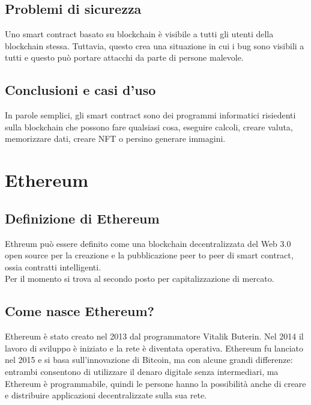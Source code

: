 \documentclass[a4paper,11pt]{report}
\begin{document}
\section{Problemi di sicurezza}
Uno smart contract basato su blockchain è visibile a tutti gli utenti della blockchain stessa. Tuttavia, questo crea una situazione in cui i bug sono visibili a tutti e questo può portare attacchi da parte di persone malevole.

\section{Conclusioni e casi d'uso}
In parole semplici, gli smart contract sono dei programmi informatici risiedenti sulla blockchain che possono fare qualsiasi cosa, eseguire calcoli, creare valuta, memorizzare dati, creare NFT o persino generare immagini.

\chapter{Ethereum}
\section{Definizione di Ethereum}
Ethreum può essere definito come una blockchain decentralizzata del Web 3.0 open source per la creazione e la pubblicazione peer to peer di smart contract, ossia contratti intelligenti.\\
Per il momento si trova al secondo posto per capitalizzazione di mercato.

\section{Come nasce Ethereum?}
Ethereum è stato creato nel 2013 dal programmatore Vitalik Buterin. Nel 2014 il lavoro di sviluppo è iniziato e la rete è diventata operativa.
Ethereum fu lanciato nel 2015 e si basa sull'innovazione di Bitcoin, ma con alcune grandi differenze: entrambi consentono di utilizzare il denaro digitale senza intermediari, ma Ethereum è programmabile, quindi le persone hanno la possibilità anche di creare e distribuire applicazioni decentralizzate sulla sua rete. 
\end{document}
